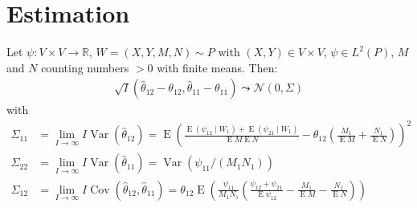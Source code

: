 \documentclass{beamer}
\DeclareMathOperator{\E}{E}
\DeclareMathOperator{\V}{Var}
\DeclareMathOperator{\cov}{Cov}
\newcommand{\I}{I}
\renewcommand{\P}{P}
\newcommand{\cind}{\perp \!\!\! \perp}
\newcommand{\aucindiv}{\theta_{11}}%
\newcommand{\aucpop}{\theta_{12}}%
\newcommand{\aucindivhat}{\hat{\theta}_{11}}%
\newcommand{\aucpophat}{\hat{\theta}_{12}}%
\newcommand{\Kernel}{\psi}
\newcommand{\W}[1]{W_{#1}}
\begin{document}
\section{Estimation}
\begin{frame}
 Let $\psi:V\times V\to\mathbb{R}$, $W=(X,Y,M,N)\sim\P$ with $(X,Y)\in V\times V$, $\psi\in L^2(\P)$, $M$ and $N$ counting numbers $> 0$ with finite means. Then:
  \begin{align}
    \sqrt{\I}(\aucpophat-\aucpop,\aucindivhat-\aucindiv) \leadsto \mathcal{N}(0,\Sigma)
  \end{align}
  with
  {\small
  \begin{align}
    \Sigma_{11} &= \lim_{\I\to\infty} \I\V(\hat\aucpop) =
    \E\left(\frac{\E(\Kernel_{12}\mid\W{1})+\E(\Kernel_{21}\mid\W{1})}{\E M\E N} - \aucpop\left(\frac{M_1}{\E M} + \frac{N_1}{\E N}\right)   \right)^2
    \\
    \Sigma_{22} &= \lim_{\I\to\infty} \I\V(\hat\aucindiv) =
    \V(\Kernel_{11}/(M_1N_1))
    \\
    \Sigma_{12} &= \lim_{\I\to\infty} \I\cov(\hat\aucpop,\hat\aucindiv) =
    \aucpop\E\left(\frac{\Kernel_{11}}{M_1N_1}\left(\frac{\Kernel_{12}+\Kernel_{21}}{\E\Kernel_{12}} - \frac{M_1}{\E M}-\frac{N_1}{\E N}  \right) \right)
  \end{align}
}  
\end{frame}
\end{document}
